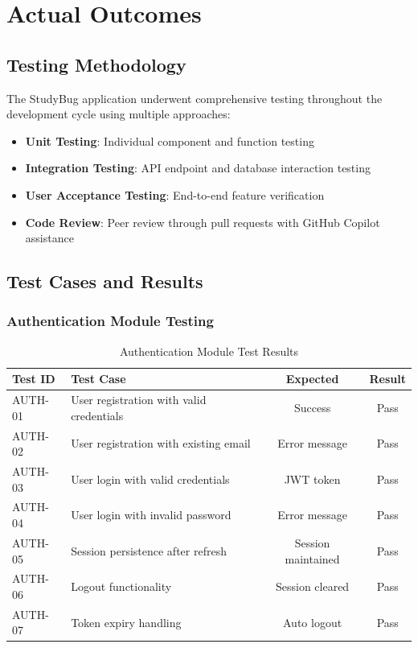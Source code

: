 \chapter{Actual Outcomes}

\section{Testing Methodology}
The StudyBug application underwent comprehensive testing throughout the development cycle using multiple approaches:

\begin{itemize}
    \item \textbf{Unit Testing}: Individual component and function testing
    \item \textbf{Integration Testing}: API endpoint and database interaction testing
    \item \textbf{User Acceptance Testing}: End-to-end feature verification
    \item \textbf{Code Review}: Peer review through pull requests with GitHub Copilot assistance
\end{itemize}

\section{Test Cases and Results}

\subsection{Authentication Module Testing}
\begin{table}[H]
\centering
\begin{tabular}{|l|p{5cm}|c|c|}
\hline
\textbf{Test ID} & \textbf{Test Case} & \textbf{Expected} & \textbf{Result} \\
\hline
AUTH-01 & User registration with valid credentials & Success & Pass \\
AUTH-02 & User registration with existing email & Error message & Pass \\
AUTH-03 & User login with valid credentials & JWT token & Pass \\
AUTH-04 & User login with invalid password & Error message & Pass \\
AUTH-05 & Session persistence after refresh & Session maintained & Pass \\
AUTH-06 & Logout functionality & Session cleared & Pass \\
AUTH-07 & Token expiry handling & Auto logout & Pass \\
\hline
\end{tabular}
\caption{Authentication Module Test Results}
\end{table}

